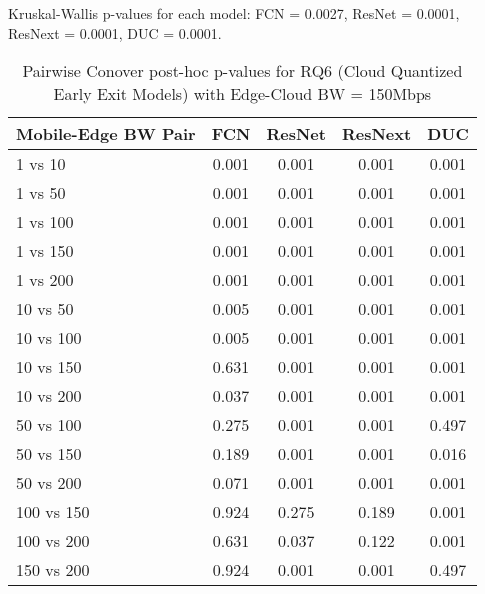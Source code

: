 \begin{table}[h]
\centering
\caption{Pairwise Conover post-hoc p-values for RQ6 (Cloud Quantized Early Exit Models) with Edge-Cloud BW = 150Mbps}
\label{tab:conover_cloud_quantized_earlyexit_ec150}
\smallskip
Kruskal-Wallis p-values for each model: FCN = 0.0027, ResNet = 0.0001, ResNext = 0.0001, DUC = 0.0001.

\begin{tabular}{lcccc}
\toprule
Mobile-Edge BW Pair & FCN & ResNet & ResNext & DUC \\
\midrule
1 vs 10 & 0.001 & 0.001 & 0.001 & 0.001 \\
1 vs 50 & 0.001 & 0.001 & 0.001 & 0.001 \\
1 vs 100 & 0.001 & 0.001 & 0.001 & 0.001 \\
1 vs 150 & 0.001 & 0.001 & 0.001 & 0.001 \\
1 vs 200 & 0.001 & 0.001 & 0.001 & 0.001 \\
10 vs 50 & 0.005 & 0.001 & 0.001 & 0.001 \\
10 vs 100 & 0.005 & 0.001 & 0.001 & 0.001 \\
10 vs 150 & 0.631 & 0.001 & 0.001 & 0.001 \\
10 vs 200 & 0.037 & 0.001 & 0.001 & 0.001 \\
50 vs 100 & 0.275 & 0.001 & 0.001 & 0.497 \\
50 vs 150 & 0.189 & 0.001 & 0.001 & 0.016 \\
50 vs 200 & 0.071 & 0.001 & 0.001 & 0.001 \\
100 vs 150 & 0.924 & 0.275 & 0.189 & 0.001 \\
100 vs 200 & 0.631 & 0.037 & 0.122 & 0.001 \\
150 vs 200 & 0.924 & 0.001 & 0.001 & 0.497 \\
\bottomrule
\end{tabular}
\end{table}

